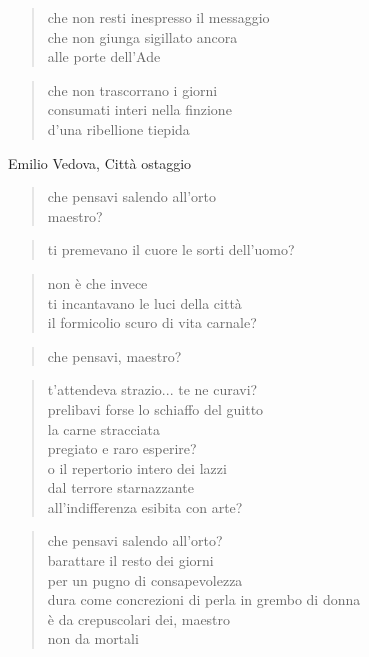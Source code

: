 	\begin{verse}
		che non resti inespresso il messaggio\\
		che non giunga sigillato ancora\\
		alle porte dell'Ade
	\end{verse}

	\begin{verse}
		che non trascorrano i giorni\\
		consumati interi nella finzione\\
		d'una ribellione tiepida
	\end{verse}

\clearpage


\begin{artItem}
	Emilio Vedova, Città ostaggio
\end{artItem}

	\begin{verse}
		che pensavi salendo all'orto\\
		maestro?
	\end{verse}

	\begin{verse}
		ti premevano il cuore le sorti dell'uomo?
	\end{verse}

	\begin{verse}
		non è che invece\\
		ti incantavano le luci della città\\
		il formicolio scuro di vita carnale?
	\end{verse}

	\begin{verse}
		che pensavi, maestro?
	\end{verse}

	\begin{verse}
		t'attendeva strazio... te ne curavi?\\
		prelibavi forse lo schiaffo del guitto\\
		la carne stracciata\\
		pregiato e raro esperire?\\
		o il repertorio intero dei lazzi\\
		dal terrore starnazzante\\
		all'indifferenza esibita con arte?
	\end{verse}

	\begin{verse}
		che pensavi salendo all'orto?\\
		barattare il resto dei giorni\\
		per un pugno di consapevolezza\\
		dura come concrezioni di perla in grembo di donna\\
		è da crepuscolari dei, maestro\\
		non da mortali
	\end{verse}

